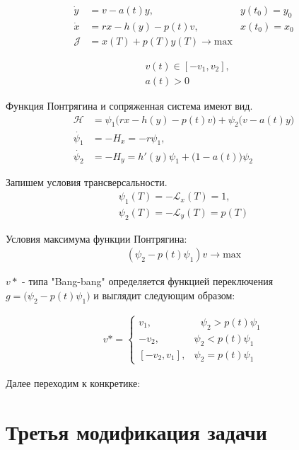 \begin{align}
    \Dot{y} & = v - a(t) y, & y(t_{0}) = y_{0} \\
    \Dot{x} & = r x - h(y) - p(t) v, & x(t_{0}) = x_{0} \\
    \mathcal{J} & = x(T) + p(T) y(T) \to \mathrm{max}
\end{align}

\begin{align}
    & v(t) \in [-v_{1}, v_{2}], \\
    & a(t) > 0
\end{align}

Функция Понтрягина и сопряженная система имеют вид. 
\begin{align}
    \mathcal{H} & = \psi_{1} \big( r x- h(y) - p(t) v \big) + \psi_{2} \big( v - a(t)y \big)\\
    \Dot{\psi_{1}} & = -H_x = -r \psi_{1},\\
    \Dot{\psi_{2}} & = -H_y = h'(y) \psi_{1} + \big(1- a(t)\big)\psi_{2}
\end{align} 

Запишем  условия трансверсальности.
\begin{align}
    {\psi_{1}(T)} = \mathcal{- L}_x(T)= 1,\\
    {\psi_{2}(T)} = \mathcal {- L}_y(T)= p(T)
\end{align} 


Условия максимума функции Понтрягина:\\
\begin{align}
     (\psi_{2} - p(t)\psi_{1})v \to \mathrm{max}
\end{align}


${v*}$ - типа "Bang-bang" определяется функцией переключения\\
$g = \big (\psi_{2} - p(t)\psi_{1} \big)$ и выглядит следующим образом:

\begin{align}
v* = 
 \begin{cases}
   v_{1}, &\text{ $\psi_{2} > p(t)\psi_{1}$}\\
   -v_{2}, &\text{$\psi_{2} < p(t)\psi_{1}$}\\
   [-v_{2},v_{1}], &\text{$\psi_{2} = p(t)\psi_{1}$}
 \end{cases}
\end{align}

Далее переходим к конкретике: 
\section{Третья модификация задачи}

